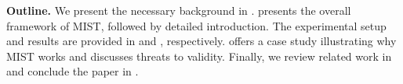 

{\bf Outline.} 
We present the necessary background in .
 presents the overall framework of MIST, followed by detailed introduction. The experimental setup and results are provided in  and , respectively.
 offers a case study illustrating why MIST works and discusses threats to validity. Finally, we review related work in  and conclude the paper in .